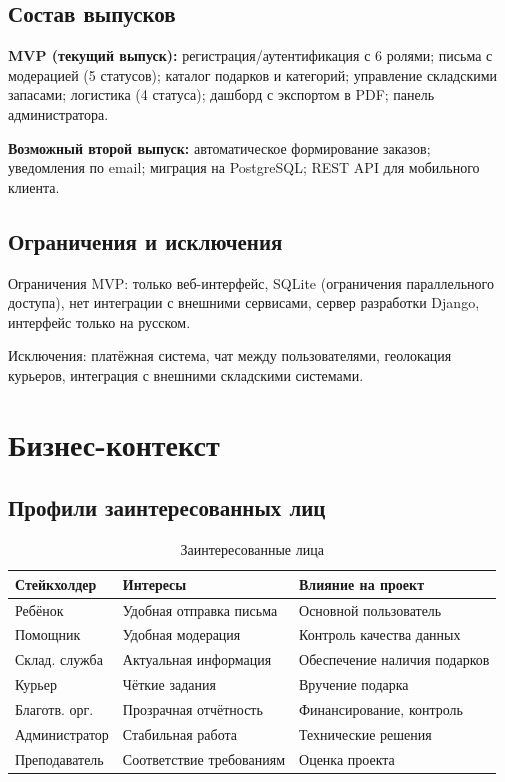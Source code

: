 \documentclass[14pt,a4paper]{extarticle}
\begin{document}
\subsection{Состав выпусков}

\textbf{MVP (текущий выпуск):} регистрация/аутентификация с 6 ролями; письма с модерацией (5 статусов); каталог подарков и категорий; управление складскими запасами; логистика (4 статуса); дашборд с экспортом в PDF; панель администратора.

\textbf{Возможный второй выпуск:} автоматическое формирование заказов; уведомления по email; миграция на PostgreSQL; REST API для мобильного клиента.

\subsection{Ограничения и исключения}

Ограничения MVP: только веб-интерфейс, SQLite (ограничения параллельного доступа), нет интеграции с внешними сервисами, сервер разработки Django, интерфейс только на русском.

Исключения: платёжная система, чат между пользователями, геолокация курьеров, интеграция с внешними складскими системами.

\newpage

\section{Бизнес-контекст}

\subsection{Профили заинтересованных лиц}

\begin{table}[H]
\centering
\caption{Заинтересованные лица}
\label{tab:stakeholders}
\small
\begin{tabular}{|L{3cm}|L{4.5cm}|L{5cm}|}
\hline
\textbf{Стейкхолдер} & \textbf{Интересы} & \textbf{Влияние на проект} \\
\hline
Ребёнок & Удобная отправка письма & Основной пользователь \\
\hline
Помощник & Удобная модерация & Контроль качества данных \\
\hline
Склад. служба & Актуальная информация & Обеспечение наличия подарков \\
\hline
Курьер & Чёткие задания & Вручение подарка \\
\hline
Благотв. орг. & Прозрачная отчётность & Финансирование, контроль \\
\hline
Администратор & Стабильная работа & Технические решения \\
\hline
Преподаватель & Соответствие требованиям & Оценка проекта \\
\hline
\end{tabular}
\end{table}
\end{document}
